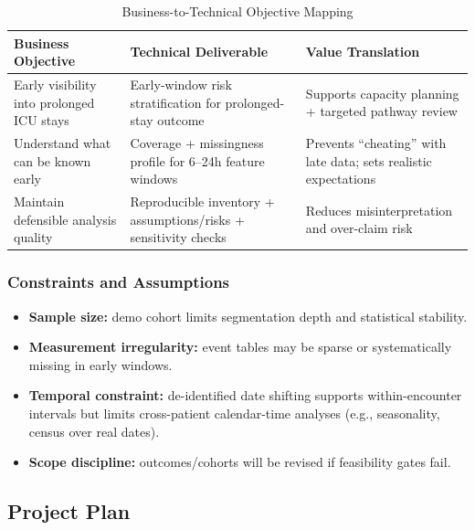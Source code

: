 \documentclass[12pt]{article}
\begin{document}
\begin{table}[H]
\centering
\caption{Business-to-Technical Objective Mapping}
\label{tab:obj_mapping}
\begin{tabular}{p{4.2cm} p{4.2cm} p{4.2cm}}
\toprule
\textbf{Business Objective} & \textbf{Technical Deliverable} & \textbf{Value Translation} \\
\midrule
Early visibility into prolonged ICU stays & Early-window risk stratification for prolonged-stay outcome & Supports capacity planning + targeted pathway review \\
Understand what can be known early & Coverage + missingness profile for 6--24h feature windows & Prevents ``cheating'' with late data; sets realistic expectations \\
Maintain defensible analysis quality & Reproducible inventory + assumptions/risks + sensitivity checks & Reduces misinterpretation and over-claim risk \\
\bottomrule
\end{tabular}
\end{table}

\subsubsection*{Constraints and Assumptions}
\begin{itemize}[leftmargin=1.5em]
    \item \textbf{Sample size:} demo cohort limits segmentation depth and statistical stability.
    \item \textbf{Measurement irregularity:} event tables may be sparse or systematically missing in early windows.
    \item \textbf{Temporal constraint:} de-identified date shifting supports within-encounter intervals but limits cross-patient calendar-time analyses (e.g., seasonality, census over real dates).
    \item \textbf{Scope discipline:} outcomes/cohorts will be revised if feasibility gates fail.
\end{itemize}

\subsection{Project Plan}
\label{subsec:project_plan}

%
%
\end{document}
